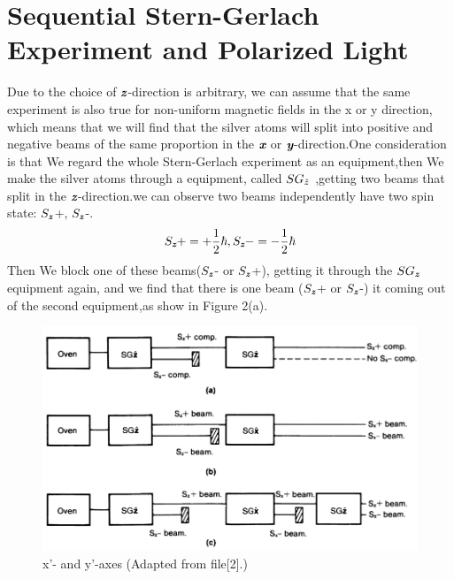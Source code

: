 \documentclass[a4paper]{article}
\def\mathbi#1{\textbf{\em #1}}
\begin{document}
\section{Sequential Stern-Gerlach Experiment and Polarized Light}
Due to the choice of $\mathbi{z}$-direction is arbitrary, we can assume that the same experiment is also true for non-uniform magnetic fields in the x or y direction, which means that we will find that the silver atoms will split into positive and negative beams of the same proportion in the  $\mathbi{x}$ or $\mathbi{y}$-direction.One consideration is that We regard the whole Stern-Gerlach experiment as an equipment,then We make the silver atoms through a equipment, called \textbf{$SG_{\mathbi{$\hat{z}$}}$} ,getting two beams that split in the $\mathbi{z}$-direction.we can observe two beams independently have two  spin state: $\textbf{$S_{\mathbi{z}}$}$+, $\textbf{$S_{\mathbi{z}}$}$-.
\begin{equation}
\textbf{$S_{\mathbi{z}}$}+=+\frac{1}{2}\hbar, \textbf{$S_{\mathbi{z}}$}-=-\frac{1}{2}\hbar
\end{equation}
Then We block one of these beams($\textbf{$S_{\mathbi{z}}$}$- or $\textbf{$S_{\mathbi{z}}$}$+), getting it through the \textbf{$SG_{\mathbi{z}}$} equipment again, and we find that there is one beam ($\textbf{$S_{\mathbi{z}}$}$+ or $\textbf{$S_{\mathbi{z}}$}$-) it coming out of the second equipment,as show in Figure 2(a).
\begin{figure}[htbp!] \label{figure}
\centering %
    \includegraphics[width=1.0\linewidth]{33.jpg}
    
    \caption{x'- and y'-axes (Adapted from file[2].)}
\end{figure}
\end{document}
